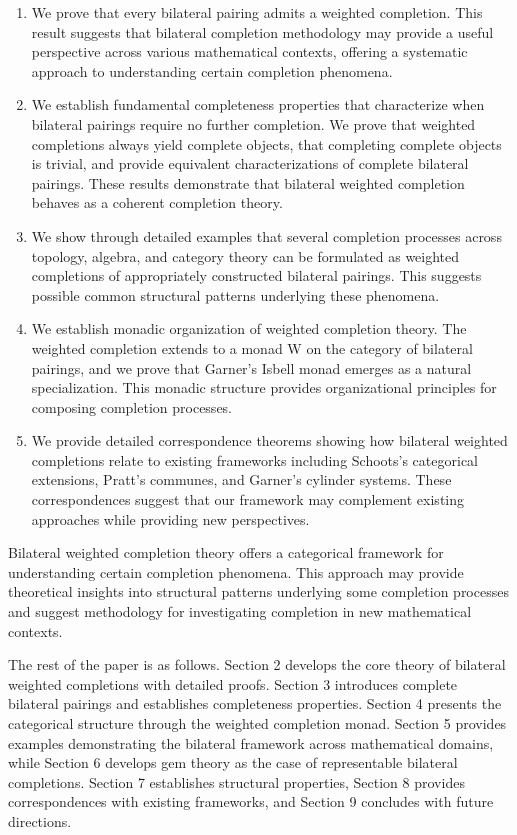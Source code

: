 \documentclass[11pt]{article}
\theoremstyle{plain}
\theoremstyle{definition}
\theoremstyle{remark}
\begin{document}
\begin{enumerate}

\item We prove that every bilateral pairing admits a weighted completion. This result suggests that bilateral completion methodology may provide a useful perspective across various mathematical contexts, offering a systematic approach to understanding certain completion phenomena.

\item We establish fundamental completeness properties that characterize when bilateral pairings require no further completion. We prove that weighted completions always yield complete objects, that completing complete objects is trivial, and provide equivalent characterizations of complete bilateral pairings. These results demonstrate that bilateral weighted completion behaves as a coherent completion theory.

\item We show through detailed examples that several completion processes across topology, algebra, and category theory can be formulated as weighted completions of appropriately constructed bilateral pairings. This suggests possible common structural patterns underlying these phenomena.

\item We establish monadic organization of weighted completion theory. The weighted completion extends to a monad W on the category of bilateral pairings, and we prove that Garner's Isbell monad emerges as a natural specialization. This monadic structure provides organizational principles for composing completion processes.

\item We provide detailed correspondence theorems showing how bilateral weighted completions relate to existing frameworks including Schoots's categorical extensions, Pratt's communes, and Garner's cylinder systems. These correspondences suggest that our framework may complement existing approaches while providing new perspectives.

\end{enumerate}

Bilateral weighted completion theory offers a categorical framework for understanding certain completion phenomena. This approach may provide theoretical insights into structural patterns underlying some completion processes and suggest methodology for investigating completion in new mathematical contexts.

The rest of the paper is as follows. Section 2 develops the core theory of bilateral weighted completions with detailed proofs. Section 3 introduces complete bilateral pairings and establishes completeness properties. Section 4 presents the categorical structure through the weighted completion monad. Section 5 provides examples demonstrating the bilateral framework across mathematical domains, while Section 6 develops gem theory as the case of representable bilateral completions. Section 7 establishes structural properties, Section 8 provides correspondences with existing frameworks, and Section 9 concludes with future directions.
\end{document}
